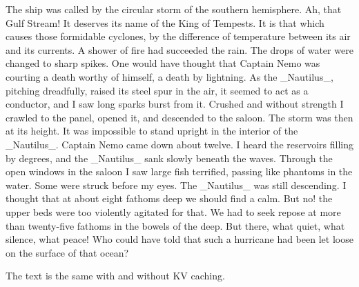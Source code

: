 \begin{enumerate}
\begin{enumerate}
\begin{answerbox}[4in]
    The ship was called by the circular storm of the southern hemisphere. Ah,
    that Gulf Stream! It deserves its name of the King of Tempests. It is that
    which causes those formidable cyclones, by the difference of temperature
    between its air and its currents. A shower of fire had succeeded the rain.
    The drops of water were changed to sharp spikes. One would have thought that
    Captain Nemo was courting a death worthy of himself, a death by lightning.
    As the \_Nautilus\_, pitching dreadfully, raised its steel spur in the air, it
    seemed to act as a conductor, and I saw long sparks burst from it. Crushed
    and without strength I crawled to the panel, opened it, and descended to the
    saloon. The storm was then at its height. It was impossible to stand upright
    in the interior of the \_Nautilus\_. Captain Nemo came down about twelve. I
    heard the reservoirs filling by degrees, and the \_Nautilus\_ sank slowly
    beneath the waves. Through the open windows in the saloon I saw large fish
    terrified, passing like phantoms in the water. Some were struck before my
    eyes. The \_Nautilus\_ was still descending. I thought that at about eight
    fathoms deep we should find a calm. But no! the upper beds were too
    violently agitated for that. We had to seek repose at more than twenty-five
    fathoms in the bowels of the deep. But there, what quiet, what silence, what
    peace! Who could have told that such a hurricane had been let loose on the
    surface of that ocean?

    The text is the same with and without KV caching.

    \end{answerbox} 
    
\end{enumerate}



\end{enumerate}
